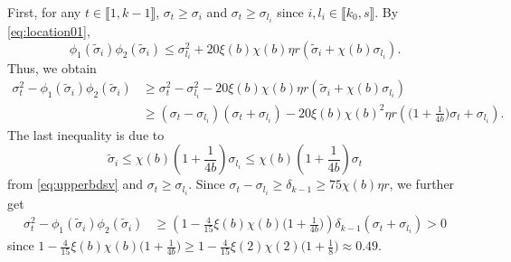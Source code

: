 \documentclass[reqno]{amsart}
\theoremstyle{plain}
\theoremstyle{definition}
\begin{document}
First, for any $t\in \llbracket 1, k-1\rrbracket$, $\sigma_t \ge \sigma_{i}$ and $\sigma_t \ge \sigma_{l_i}$ since $i,l_i \in \llbracket k_0, s\rrbracket$. By \eqref{eq:location01}, $$\phi_1(\widetilde\sigma_i)\phi_2(\widetilde\sigma_i) \le \sigma_{l_i}^2 +20\xi(b)\chi(b)\eta r(\widetilde \sigma_i +\chi(b)\sigma_{l_i}).$$Thus, we obtain
\begin{align}\label{eq:firstcase1}
\sigma_t^2 - \phi_1(\widetilde\sigma_i)\phi_2(\widetilde\sigma_i) &\ge \sigma_t^2 -\sigma_{l_i}^2 -20\xi(b)\chi(b)\eta r(\widetilde \sigma_i +\chi(b)\sigma_{l_i})\nonumber\\
&\ge (\sigma_t-\sigma_{l_i})(\sigma_t+\sigma_{l_i}) -20\xi(b)\chi(b)^2 \eta r \left(\big(1+\frac{1}{4b}\big) \sigma_t + \sigma_{l_i}\right).
\end{align}
The last inequality is due to
$$ \widetilde \sigma_i \le \chi(b)\left( 1+\frac{1}{4b} \right)\sigma_{l_i}\le \chi(b)\left( 1+\frac{1}{4b} \right)\sigma_{t}$$
from \eqref{eq:upperbdsv} and $\sigma_t \ge \sigma_{l_i}$. Since $\sigma_t- \sigma_{l_i} \ge \delta_{k-1} \ge 75\chi(b) \eta r$, we further get
\begin{align*}
\sigma_t^2 - \phi_1(\widetilde\sigma_i)\phi_2(\widetilde\sigma_i) &\ge \left( 1- \frac{4}{15}\xi(b)\chi(b)\big(1+\frac{1}{4b}\big) \right) \delta_{k-1} (\sigma_t +\sigma_{l_i})>0
\end{align*}
since $1- \frac{4}{15}\xi(b)\chi(b)\big(1+\frac{1}{4b}\big) \ge 1- \frac{4}{15}\xi(2)\chi(2)\big(1+\frac{1}{8}\big)\approx 0.49$.
\end{document}
